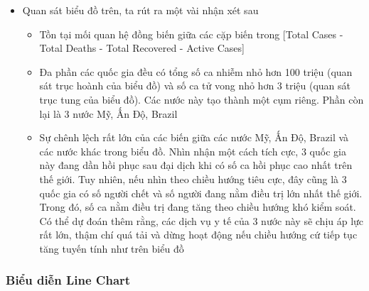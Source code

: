 \documentclass[a4paper, 12pt]{article}
\begin{document}
\begin{itemize}
    \item Quan sát biểu đồ trên, ta rút ra một vài nhận xét sau
    \begin{itemize}
        \item Tồn tại mối quan hệ đồng biến giữa các cặp biến trong [Total Cases - Total Deaths - Total Recovered - Active Cases]
        \item Đa phần các quốc gia đều có tổng số ca nhiễm nhỏ hơn 100 triệu (quan sát trục hoành của biểu đồ) và số ca tử vong nhỏ hơn 3 triệu (quan sát trục tung của biểu đồ). Các nước này tạo thành một cụm riêng. Phần còn lại là 3 nước Mỹ, Ấn Độ, Brazil
        \item Sự chênh lệch rất lớn của các biến giữa các nước Mỹ, Ấn Độ, Brazil và các nước khác trong biểu đồ. Nhìn nhận một cách tích cực, 3 quốc gia này đang dần hồi phục sau đại dịch khi có số ca hồi phục cao nhất trên thế giới. Tuy nhiên, nếu nhìn theo chiều hướng tiêu cực, đây cũng là 3 quốc gia có số người chết và số người đang nằm điều trị lớn nhất thế giới. Trong đó, số ca nằm điều trị đang tăng theo chiều hướng khó kiểm soát. Có thể dự đoán thêm rằng, các dịch vụ y tế của 3 nước này sẽ chịu áp lực rất lớn, thậm chí quá tải và dừng hoạt động nếu chiều hướng cứ tiếp tục tăng tuyến tính như trên biểu đồ
    \end{itemize}
\end{itemize}

\subsubsection{Biểu diễn Line Chart}
\end{document}

